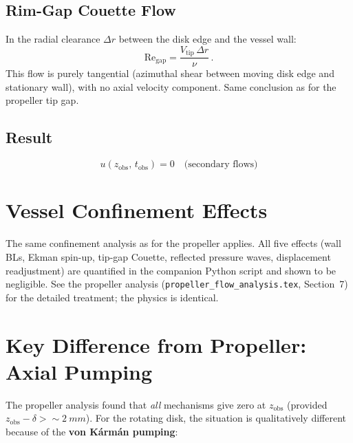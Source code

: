 \documentclass[11pt,a4paper]{article}
\begin{document}
\subsection{Rim-Gap Couette Flow}

In the radial clearance $\Delta r$ between the disk edge and the vessel
wall:
\begin{equation}
  \mathrm{Re}_\mathrm{gap}
    = \frac{V_\mathrm{tip}\,\Delta r}{\nu}\,.
\end{equation}
This flow is purely tangential (azimuthal shear between moving disk
edge and stationary wall), with no axial velocity component. Same
conclusion as for the propeller tip gap.

\subsection{Result}

\begin{equation}
  \boxed{u(z_\mathrm{obs},\, t_\mathrm{obs})
    = 0 \quad \text{(secondary flows)}}
\end{equation}


\section{Vessel Confinement Effects}
\label{sec:confinement}

The same confinement analysis as for the propeller applies. All five
effects (wall BLs, Ekman spin-up, tip-gap Couette, reflected pressure
waves, displacement readjustment) are quantified in the companion
Python script and shown to be negligible. See the propeller analysis
(\texttt{propeller\_flow\_analysis.tex}, Section~7) for the detailed
treatment; the physics is identical.


\section{Key Difference from Propeller: Axial Pumping}
\label{sec:comparison}

The propeller analysis found that \emph{all} mechanisms give zero at
$z_\mathrm{obs}$ (provided $z_\mathrm{obs} - \delta > \sim\SI{2}{mm}$).
For the rotating disk, the situation is qualitatively different because
of the \textbf{von K\'arm\'an pumping}:
\end{document}
